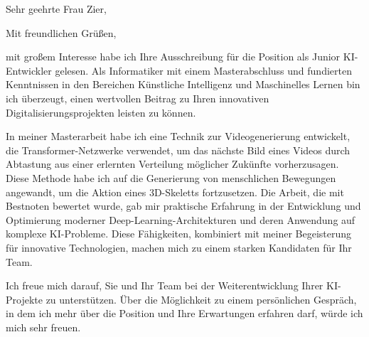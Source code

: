 \documentclass[11pt,a4paper,skipsamekey]{moderncv}
\begin{document}
	\date{\today}
	\opening{Sehr geehrte Frau Zier,}
	\closing{Mit freundlichen Grüßen,}
	\makelettertitle
	
	mit großem Interesse habe ich Ihre Ausschreibung für die Position als Junior KI-Entwickler gelesen. Als Informatiker mit einem Masterabschluss und fundierten Kenntnissen in den Bereichen Künstliche Intelligenz und Maschinelles Lernen bin ich überzeugt, einen wertvollen Beitrag zu Ihren innovativen Digitalisierungsprojekten leisten zu können.
	
	In meiner Masterarbeit habe ich eine Technik zur Videogenerierung entwickelt, die Transformer-Netzwerke verwendet, um das nächste Bild eines Videos durch Abtastung aus einer erlernten Verteilung möglicher Zukünfte vorherzusagen. Diese Methode habe ich auf die Generierung von menschlichen Bewegungen angewandt, um die Aktion eines 3D-Skeletts fortzusetzen. Die Arbeit, die mit Bestnoten bewertet wurde, gab mir praktische Erfahrung in der Entwicklung und Optimierung moderner Deep-Learning-Architekturen und deren Anwendung auf komplexe KI-Probleme. Diese Fähigkeiten, kombiniert mit meiner Begeisterung für innovative Technologien, machen mich zu einem starken Kandidaten für Ihr Team.
	
	Ich freue mich darauf, Sie und Ihr Team bei der Weiterentwicklung Ihrer KI-Projekte zu unterstützen. Über die Möglichkeit zu einem persönlichen Gespräch, in dem ich mehr über die Position und Ihre Erwartungen erfahren darf, würde ich mich sehr freuen.
	
	
	\vspace{0.5cm}
	\makeletterclosing
	
	
	
	
\end{document}
